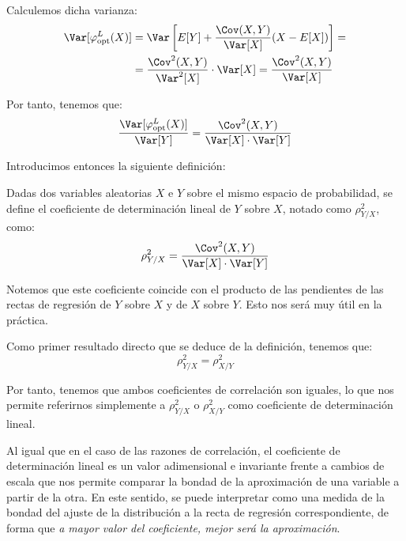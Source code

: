 Calculemos dicha varianza:
\begin{align*}
    \Var[\varphi_{\text{opt}}^L(X)] &= \Var\left[E[Y] + \dfrac{\Cov(X,Y)}{\Var[X]}(X - E[X])\right]
    =\\&=
    \dfrac{\Cov^2(X,Y)}{\Var^2[X]}\cdot \Var[X]= \dfrac{\Cov^2(X,Y)}{\Var[X]}
\end{align*}

Por tanto, tenemos que:
\begin{equation*}
    \dfrac{\Var[\varphi_{\text{opt}}^L(X)]}{\Var[Y]} = \dfrac{\Cov^2(X,Y)}{\Var[X]\cdot \Var[Y]}
\end{equation*}

Introducimos entonces la siguiente definición:
\begin{definicion}
    Dadas dos variables aleatorias $X$ e $Y$ sobre el mismo espacio de probabilidad, se define el coeficiente de determinación lineal de $Y$ sobre $X$, notado como $\rho^2_{Y/X}$, como:
    \begin{equation*}
        \rho_{Y/X}^2 = \dfrac{\Cov^2(X,Y)}{\Var[X]\cdot \Var[Y]}
    \end{equation*}
\end{definicion}
\begin{observacion}
    Notemos que este coeficiente coincide con el producto de las pendientes de las rectas de regresión de $Y$ sobre $X$ y de $X$ sobre $Y$. Esto nos será muy útil en la práctica.
\end{observacion}

Como primer resultado directo que se deduce de la definición, tenemos que:
\begin{equation*}
    \rho_{Y/X}^2 = \rho_{X/Y}^2
\end{equation*}

Por tanto, tenemos que ambos coeficientes de correlación son iguales, lo que nos permite referirnos simplemente a $\rho^2_{Y/X}$ o $\rho^2_{X/Y}$ como coeficiente de determinación lineal.

Al igual que en el caso de las razones de correlación, el coeficiente de determinación lineal es un valor adimensional e invariante frente a cambios de escala que nos permite comparar la bondad de la aproximación de una variable a partir de la otra. En este sentido, se puede interpretar como una medida de la bondad del ajuste de la distribución a la recta de regresión correspondiente, de forma que \emph{a mayor valor del coeficiente, mejor será la aproximación}.

